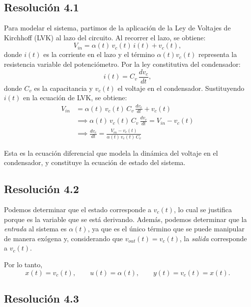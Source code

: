 \documentclass[
  11pt,
  letterpaper,
   addpoints,
  answers
  ]{exam}
\begin{document}
\begin{questions}
\begin{solution}
\subsection*{Resolución 4.1}

Para modelar el sistema, partimos de la aplicación de la Ley de Voltajes de Kirchhoff (LVK) al lazo del circuito. Al recorrer el lazo, se obtiene:
\begin{equation}
V_{in} = \alpha(t)\,v_c(t)\,i(t) + v_c(t),
\end{equation}
donde $i(t)$ es la corriente en el lazo y el término $\alpha(t)v_c(t)$ representa la resistencia variable del potenciómetro. Por la ley constitutiva del condensador:
\begin{equation}
i(t) = C_v\,\frac{dv_c}{dt},
\end{equation}
donde $C_v$ es la capacitancia y $v_c(t)$ el voltaje en el condensador. Sustituyendo $i(t)$ en la ecuación de LVK, se obtiene:
\begin{align}
V_{in} &= \alpha(t)\,v_c(t)\,C_v\,\frac{dv_c}{dt} + v_c(t) \\
&\implies \alpha(t)\,v_c(t)\,C_v\,\frac{dv_c}{dt} = V_{in} - v_c(t) \\
&\implies \frac{dv_c}{dt} = \frac{V_{in} - v_c(t)}{\alpha(t)\,v_c(t)\,C_v}
\end{align}

Esta es la ecuación diferencial que modela la dinámica del voltaje en el condensador, y constituye la ecuación de estado del sistema.

\subsection*{Resolución 4.2}

Podemos determinar que el estado corresponde a $v_c(t)$, lo cual se justifica porque es la variable que se está derivando. Además, podemos determinar que la \emph{entrada} al sistema es $\alpha(t)$, ya que es el único término que se puede manipular de manera exógena y, considerando que $v_{out}(t)=v_c(t)$, la \emph{salida} corresponde a $v_c(t)$.

Por lo tanto,
\begin{equation}
\boxed{\,x(t)=v_c(t), \qquad u(t)=\alpha(t), \qquad y(t)=v_c(t)=x(t).\,}
\end{equation}

\subsection*{Resolución 4.3}


\end{solution}
\end{questions}
\end{document}
